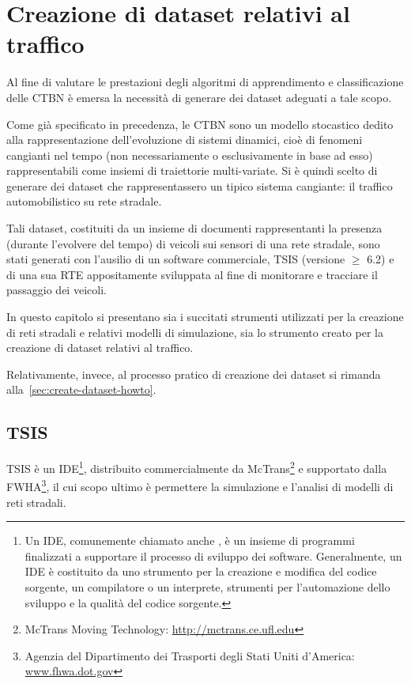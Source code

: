 
\chapter{Creazione di dataset relativi al traffico}
\label{cap:tsis-sensors}
Al fine di valutare le prestazioni degli algoritmi di apprendimento e classificazione delle \acl{CTBN} è emersa la necessità di generare dei dataset adeguati a tale scopo.

Come già specificato in precedenza, le \acs{CTBN} sono un modello stocastico dedito alla rappresentazione dell'evoluzione di sistemi dinamici, cioè di fenomeni cangianti nel tempo (non necessariamente o esclusivamente in base ad esso) rappresentabili come insiemi di traiettorie multi-variate. Si è quindi scelto di generare dei dataset che rappresentassero un tipico sistema cangiante: il traffico automobilistico su rete stradale.

Tali dataset, costituiti da un insieme di documenti rappresentanti la presenza (durante l'evolvere del tempo) di veicoli sui sensori di una rete stradale, sono stati generati con l'ausilio di un software commerciale, \acf{TSIS} (versione $\geq$ 6.2) e di una sua \acl{RTE} appositamente sviluppata al fine di monitorare e tracciare il passaggio dei veicoli. 

In questo capitolo si presentano sia i succitati strumenti utilizzati per la creazione di reti stradali e relativi modelli di simulazione, sia lo strumento creato per la creazione di dataset relativi al traffico.

Relativamente, invece, al processo pratico di creazione dei dataset si rimanda alla~\autoref{sec:create-dataset-howto}.

\section{TSIS}
\label{sec:tsis}
\acf{TSIS} è un \acl{IDE}\footnote{Un \acl{IDE}, comunemente chiamato anche , è un insieme di programmi finalizzati a supportare il processo di sviluppo dei software. Generalmente, un \acs{IDE} è costituito da uno strumento per la creazione e modifica del codice sorgente, un compilatore o un interprete, strumenti per l'automazione dello sviluppo e la qualità del codice sorgente.}, distribuito commercialmente da McTrans\footnote{McTrans Moving Technology: \url{http://mctrans.ce.ufl.edu}} e supportato dalla \acf{FWHA}\footnote{Agenzia del Dipartimento dei Trasporti degli Stati Uniti d'America: \\ \url{www.fhwa.dot.gov}}, il cui scopo ultimo è permettere la simulazione e l'analisi di modelli di reti stradali.


